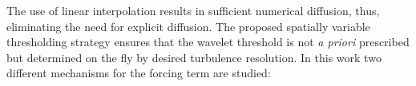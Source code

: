 The use of linear interpolation results in sufficient numerical diffusion, thus, eliminating the need for explicit diffusion.
%
%
The proposed spatially variable thresholding strategy  ensures that the wavelet threshold is not {\em a priori} prescribed but determined on the fly by desired turbulence resolution.
%
%
%
%
In this work two different mechanisms for the forcing term are studied:

